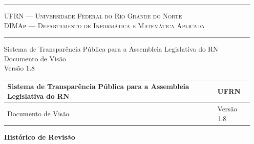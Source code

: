 \documentclass[12pt, a4paper]{article}
\begin{document}
    \begin{titlepage}
        \flushright
        \rule{\textwidth}{1pt}
        {\large \textsc{UFRN --- Universidade Federal do Rio Grande do Norte
                \\[0.5ex]
         \normalsize DIMAp --- Departamento de Informática e Matemática Aplicada}
        \vspace{-0.5ex}}
        \rule{\textwidth}{1pt}

        \vfill

        {\Huge Sistema de Transparência Pública para a Assembleia Legislativa
        do RN \\[1ex] \LARGE Documento de Visão \\[2ex] \large Versão 1.8}

        \vfill

    \end{titlepage}

    \begin{tabu}{X | X[-1]}
        \hline
        Sistema de Transparência Pública para a Assembleia Legislativa do RN &
        UFRN
        \\ \hline

        Documento de Visão &
        Versão 1.8
        \\ \hline
    \end{tabu}

    \bigskip

    {\Large\textbf{Histórico de Revisão}}

    \vspace{2ex}
\end{document}
